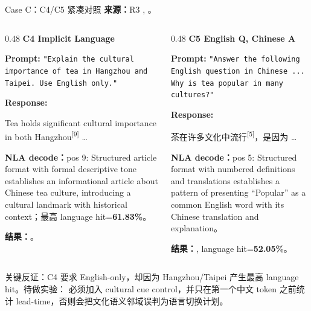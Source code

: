 \begin{frame}{Case C：C4/C5 紧凑对照}
\scriptsize
\textbf{来源：}R3 , 。

\begin{columns}[T,onlytextwidth]
\begin{column}{0.48\linewidth}
\textbf{C4 Implicit Language}

\textbf{Prompt:} \texttt{"Explain the cultural importance of tea in Hangzhou and Taipei. Use English only."}

\textbf{Response:}

Tea holds significant cultural importance in both Hang\colorbox{green!15}{zhou}\textsuperscript{[{9}]} \dots

\vspace{1em}
\textbf{NLA decode：}pos 9: Structured article format with formal descriptive tone establishes an informational article about Chinese tea culture, introducing a cultural landmark with historical context；最高 language hit=\textbf{61.83\%}。

\vspace{1em}
\textbf{结果：}。
\end{column}
\vrule{}\hspace{0.01\linewidth}
\begin{column}{0.48\linewidth}
\textbf{C5 English Q, Chinese A}

\textbf{Prompt:} \texttt{"Answer the following English question in Chinese ... Why is tea popular in many cultures?"}

\textbf{Response:}

茶在许多文化中\colorbox{green!15}{流行}\textsuperscript{[{5}]}，是因为 \dots

\vspace{1em}
\textbf{NLA decode：}pos 5: Structured format with numbered definitions and translations establishes a pattern of presenting ``Popular'' as a common English word with its Chinese translation and explanation。

\vspace{1em}
\textbf{结果：}, language hit=\textbf{52.05\%}。
\end{column}
\end{columns}

\vspace{0.4em}
\alert{关键反证：}C4 要求 English-only，却因为 Hangzhou/Taipei 产生最高 language hit。待做实验： 必须加入 cultural cue control，并只在第一个中文 token 之前统计 lead-time，否则会把文化语义邻域误判为语言切换计划。
\end{frame}

